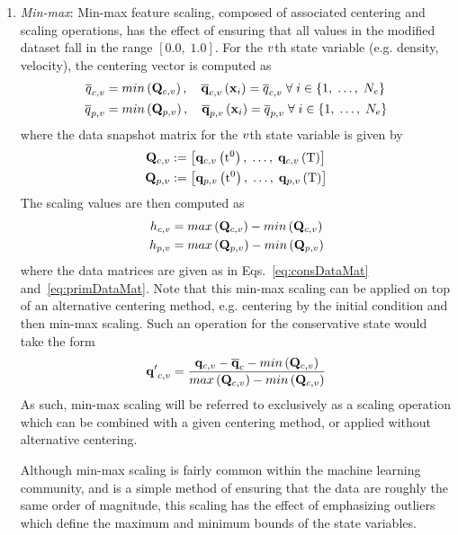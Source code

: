 \begin{enumerate}
	\item \textit{Min-max}: Min-max feature scaling, composed of associated centering and scaling operations, has the effect of ensuring that all values in the modified dataset fall in the range $[0.0, \; 1.0]$. For the $v$th state variable (e.g. density, velocity), the centering vector is computed as
	\begin{align}
		\consValCentVar &= min\left(\consDataMatVar\right), \quad \consVecCentVar\left(\spatialVec_{\dummyIdx}\right) = \consValCentVar \; \forall \; \dummyIdx \in \{1, \; \hdots, \; \numCells\} \\
		\primValCentVar &= min\left(\primDataMatVar\right), \quad \primVecCentVar\left(\spatialVec_{\dummyIdx}\right) = \primValCentVar \; \forall \; \dummyIdx \in \{1, \; \hdots, \; \numCells\}
	\end{align}
	where the data snapshot matrix for the $v$th state variable is given by
	\begin{align}
		\consDataMatVar &\defEq \left[ \consVecVar\left(\initTime\right), \; \hdots, \; \consVecVar\left(\finalTime\right) \right] \label{eq:consDataMat}\\
		\primDataMatVar &\defEq \left[ \primVecVar\left(\initTime\right), \; \hdots, \; \primVecVar\left(\finalTime\right) \right] \label{eq:primDataMat}
	\end{align}
	The scaling values are then computed as
	\begin{align}
		\consScaleVar{\varIdx} &= max\left(\consDataMatVar\right) - min\left(\consDataMatVar\right) \\
		\primScaleVar{\varIdx} &= max\left(\primDataMatVar\right) - min\left(\primDataMatVar\right)
	\end{align}
	where the data matrices are given as in Eqs.~\ref{eq:consDataMat} and~\ref{eq:primDataMat}. Note that this min-max scaling can be applied on top of an alternative centering method, e.g. centering by the initial condition and then min-max scaling. Such an operation for the conservative state would take the form
	\begin{equation}
		\consVecVarUns = \frac{\consVecVar - \consVecCent - min\left(\consDataMatVar\right)}{max\left(\consDataMatVar\right) - min\left(\consDataMatVar\right)}
	\end{equation}
	As such, min-max scaling will be referred to exclusively as a scaling operation which can be combined with a given centering method, or applied without alternative centering.
	
	Although min-max scaling is fairly common within the machine learning community, and is a simple method of ensuring that the data are roughly the same order of magnitude, this scaling has the effect of emphasizing outliers which define the maximum and minimum bounds of the state variables.
\end{enumerate}

